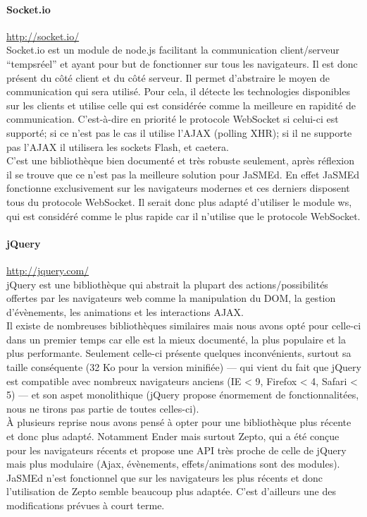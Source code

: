 \documentclass[pdftex,12pt,a4paper]{article}
\begin{document}
\paragraph{Socket.io}\url{http://socket.io/}\\
Socket.io est un module de node.js facilitant la communication client/serveur “tempsréel” et ayant pour but de fonctionner sur tous les navigateurs. Il est donc présent du côté client et du côté serveur. Il permet d’abstraire le moyen de communication qui sera utilisé. Pour cela, il détecte les technologies disponibles sur les clients et utilise celle qui est considérée comme la meilleure en rapidité de communication. C’est-à-dire en priorité le protocole WebSocket si celui-ci est supporté; si ce n’est pas le cas il utilise l’AJAX (polling XHR); si il ne supporte pas l’AJAX il utilisera les sockets Flash, et caetera.\\
C’est une bibliothèque bien documenté et très robuste seulement, après réflexion il se trouve que ce n’est pas la meilleure solution pour JaSMEd. En effet JaSMEd fonctionne exclusivement sur les navigateurs modernes et ces derniers disposent tous du protocole WebSocket. Il serait donc plus adapté d’utiliser le module ws, qui est considéré comme le plus rapide car il n’utilise que le protocole WebSocket.

\paragraph{jQuery}\url{http://jquery.com/}\\
jQuery est une bibliothèque qui abstrait la plupart des actions/possibilités offertes par les navigateurs web comme la manipulation du DOM, la gestion d’évènements, les animations et les interactions AJAX.\\
Il existe de nombreuses bibliothèques similaires mais nous avons opté pour celle-ci dans un premier temps car elle est la mieux documenté, la plus populaire et la plus performante. Seulement celle-ci présente quelques inconvénients, surtout sa taille conséquente (32 Ko pour la version minifiée) — qui vient du fait que jQuery est compatible avec nombreux navigateurs anciens (IE < 9, Firefox < 4, Safari < 5) — et son aspet monolithique (jQuery propose énormement de fonctionnalitées, nous ne tirons pas partie de toutes celles-ci).\\
À plusieurs reprise nous avons pensé à opter pour une bibliothèque plus récente et donc plus adapté. Notamment Ender mais surtout Zepto, qui a été conçue pour les navigateurs récents et propose une API très proche de celle de jQuery mais plus modulaire (Ajax, évènements, effets/animations sont des modules).\\
JaSMEd n’est fonctionnel que sur les navigateurs les plus récents et donc l’utilisation de Zepto semble beaucoup plus adaptée. C’est d'ailleurs une des modifications prévues à court terme.
\end{document}
